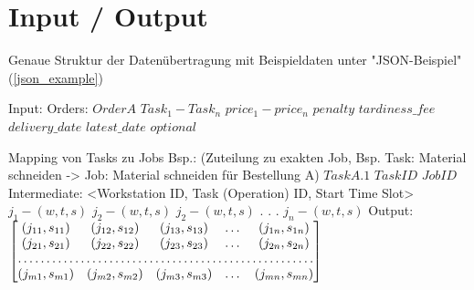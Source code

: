\documentclass[a4paper,12pt,twoside]{scrreprt}
\begin{document}
\section*{Input / Output}
Genaue Struktur der Datenübertragung mit Beispieldaten unter "JSON-Beispiel"(\autoref{json_example})
\begin{flushleft}
	Input:\linebreak
	Orders:\linebreak
	$Order A$\linebreak
	$Task_1 - Task_n$\linebreak
	$price_1 - price_n$\linebreak
	$penalty$\linebreak
	$tardiness\_fee$\linebreak
	$delivery\_date$\linebreak
	$latest\_date$\linebreak
	$optional$\linebreak
	
	Mapping von Tasks zu Jobs Bsp.:\linebreak
	(Zuteilung zu exakten Job, Bsp. Task: Material schneiden -> Job: Material schneiden für Bestellung A)\linebreak
	$Task A.1$\linebreak
	$Task ID$\linebreak
	$Job ID$ \linebreak\linebreak
	Intermediate:\linebreak
	<Workstation ID, Task (Operation) ID, Start Time Slot>
	$j_1 - (w, t, s)$\linebreak
	$j_2 - (w, t, s)$\linebreak
	$j_2 - (w, t, s)$\linebreak
	.\linebreak
	.\linebreak
	.\linebreak
	$j_n - (w, t, s)$\linebreak\linebreak
	Output:\linebreak
	$
	\begin{bmatrix}
		(j_{11}, s_{11}) & (j_{12}, s_{12}) & (j_{13}, s_{13}) & \dots & (j_{1n}, s_{1n})\\
		(j_{21}, s_{21}) & (j_{22}, s_{22}) & (j_{23}, s_{23}) & \dots & (j_{2n}, s_{2n})\\
		\hdotsfor{5} \\
		(j_{m1}, s_{m1}) & (j_{m2}, s_{m2}) & (j_{m3}, s_{m3}) & \dots & (j_{mn}, s_{mn})\\
	\end{bmatrix}
	$
	

\end{flushleft}
\end{document}
